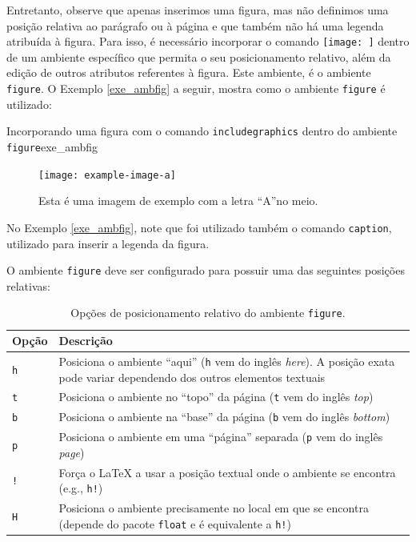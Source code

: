 Entretanto, observe que apenas inserimos uma figura, mas não definimos uma posição relativa ao parágrafo ou à página e que também não há uma legenda atribuída à figura. Para isso, é necessário incorporar o comando \texttt{\texttt{[image: ]}} dentro de um ambiente específico que permita o seu posicionamento relativo, além da edição de outros atributos referentes à figura. Este ambiente, é o ambiente {\tt figure}. O Exemplo \ref{exe_ambfig} a seguir, mostra como o ambiente {\tt figure} é utilizado:

\begin{texexptitled}[breakable,enhanced,middle=2mm]{Incorporando uma figura com o comando {\tt includegraphics} dentro do ambiente {\tt figure}}{exe_ambfig}
\begin{figure}[H]
    \texttt{[image: example-image-a]}
    \caption{Esta é uma imagem de exemplo com a letra ``A''no meio.}
\end{figure}
\end{texexptitled}

No Exemplo \ref{exe_ambfig}, note que foi utilizado também o comando \texttt{caption}, utilizado para inserir a legenda da figura.

O ambiente {\tt figure} deve ser configurado para possuir uma das seguintes posições relativas:

\begin{table}[H]
\centering
\caption{Opções de posicionamento relativo do ambiente {\tt figure}.}
\label{tab:ambfig}
    \begin{tabular}{p{2cm}p{11cm}}
    \toprule
    \textbf{Opção} & \textbf{Descrição} \\
    \midrule
    {\tt h} & Posiciona o ambiente ``aqui'' ({\tt h} vem do inglês \textit{here}). A posição exata pode variar dependendo dos outros elementos textuais \\
    {\tt t} & Posiciona o ambiente no ``topo'' da página ({\tt t} vem do inglês \textit{top}) \\
    {\tt b} & Posiciona o ambiente na ``base'' da página ({\tt b} vem do inglês \textit{bottom}) \\
    {\tt p} & Posiciona o ambiente em uma ``página'' separada ({\tt p} vem do inglês \textit{page}) \\
    {\tt !} & Força o \LaTeX{} a usar a posição textual onde o ambiente se encontra (e.g., {\tt h!}) \\
    {\tt H} & Posiciona o ambiente precisamente no local em que se encontra (depende do pacote {\tt float} e é equivalente a {\tt h!}) \\
    \bottomrule
    \end{tabular}
\end{table}

